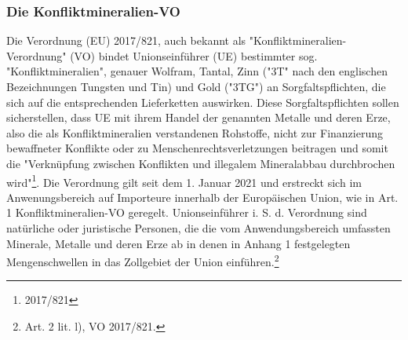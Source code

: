 \documentclass[12pt,a4paper,oneside]{book} %
\begin{document}
{	\subsubsection{Die Konfliktmineralien-VO}
	Die Verordnung (EU) 2017/821, auch bekannt als "Konfliktmineralien-Verordnung" (VO) bindet Unionseinführer (UE) bestimmter sog. "Konfliktmineralien", genauer Wolfram, Tantal, Zinn ("3T" nach den englischen Bezeichnungen Tungsten und Tin) und Gold ("3TG") an Sorgfaltspflichten, die sich auf die entsprechenden Lieferketten auswirken. Diese Sorgfaltspflichten sollen sicherstellen, dass UE mit ihrem Handel der genannten Metalle und deren Erze, also die als Konfliktmineralien verstandenen Rohstoffe, nicht zur Finanzierung bewaffneter Konflikte oder zu Menschenrechtsverletzungen beitragen und somit die "Verknüpfung zwischen Konflikten und illegalem Mineralabbau durchbrochen wird"\footnote{2017/821}. Die Verordnung gilt seit dem 1. Januar 2021 und erstreckt sich im Anwenungsbereich auf Importeure innerhalb der Europäischen Union, wie in Art. 1 Konfliktmineralien-VO geregelt. Unionseinführer i. S. d. Verordnung sind natürliche oder juristische Personen, die die vom Anwendungsbereich umfassten Minerale, Metalle und deren Erze ab in denen in Anhang 1 festgelegten Mengenschwellen in das Zollgebiet der Union einführen.\footnote{Art. 2 lit. l), VO 2017/821.} 
	
}
\end{document}
